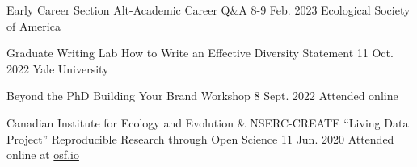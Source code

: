 \begin{cventries}
  \cventry
    {Early Career Section} %
    {Alt-Academic Career Q\&A} %
    {8-9 Feb. 2023} %
    {Ecological Society of America} %
    {
    }    

  \cventry
    {Graduate Writing Lab} %
    {How to Write an Effective Diversity Statement} %
    {11 Oct. 2022} %
    {Yale University} %
    {
    }

  \cventry
    {Beyond the PhD} %
    {Building Your Brand Workshop} %
    {8 Sept. 2022} %
    {Attended online} %
    {
    }


  \cventry
    {Canadian Institute for Ecology and Evolution \& NSERC-CREATE ``Living Data Project''} %
    {Reproducible Research through Open Science} %
    {11 Jun. 2020} %
    {Attended online at \href{https://osf.io/p7r5d/}{osf.io}} %
    {
    }


\end{cventries}

